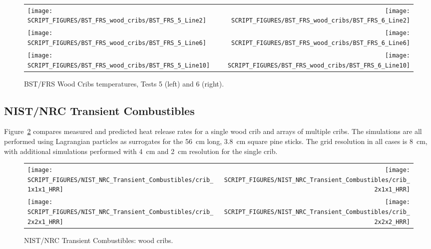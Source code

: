 \begin{figure}[p]
\begin{tabular*}{\textwidth}{l@{\extracolsep{\fill}}r}
\texttt{[image: SCRIPT\_FIGURES/BST\_FRS\_wood\_cribs/BST\_FRS\_5\_Line2]} &
\texttt{[image: SCRIPT\_FIGURES/BST\_FRS\_wood\_cribs/BST\_FRS\_6\_Line2]} \\
\texttt{[image: SCRIPT\_FIGURES/BST\_FRS\_wood\_cribs/BST\_FRS\_5\_Line6]} &
\texttt{[image: SCRIPT\_FIGURES/BST\_FRS\_wood\_cribs/BST\_FRS\_6\_Line6]} \\
\texttt{[image: SCRIPT\_FIGURES/BST\_FRS\_wood\_cribs/BST\_FRS\_5\_Line10]} &
\texttt{[image: SCRIPT\_FIGURES/BST\_FRS\_wood\_cribs/BST\_FRS\_6\_Line10]}
\end{tabular*}
\caption[BST/FRS Wood Cribs temperatures, Tests 5 and 6]{BST/FRS Wood Cribs temperatures, Tests 5 (left) and 6 (right).}
\label{BST_FRS_wood_cribs_Tests_5to6}
\end{figure}

\clearpage


\subsection{NIST/NRC Transient Combustibles}

Figure~\ref{NIST_NRC_Transient_Combustibles_cribs} compares measured and predicted heat release rates for a single wood crib and arrays of multiple cribs. The simulations are all performed using Lagrangian particles as surrogates for the 56~cm long, 3.8~cm square pine sticks. The grid resolution in all cases is 8~cm, with additional simulations performed with 4~cm and 2~cm resolution for the single crib.

\begin{figure}[!h]
\begin{tabular*}{\textwidth}{l@{\extracolsep{\fill}}r}
\texttt{[image: SCRIPT\_FIGURES/NIST\_NRC\_Transient\_Combustibles/crib\_1x1x1\_HRR]} &
\texttt{[image: SCRIPT\_FIGURES/NIST\_NRC\_Transient\_Combustibles/crib\_2x1x1\_HRR]} \\
\texttt{[image: SCRIPT\_FIGURES/NIST\_NRC\_Transient\_Combustibles/crib\_2x2x1\_HRR]} &
\texttt{[image: SCRIPT\_FIGURES/NIST\_NRC\_Transient\_Combustibles/crib\_2x2x2\_HRR]} 
\end{tabular*}
\caption[NIST/NRC Transient Combustibles: wood cribs]{NIST/NRC Transient Combustibles: wood cribs.}
\label{NIST_NRC_Transient_Combustibles_cribs}
\end{figure}

